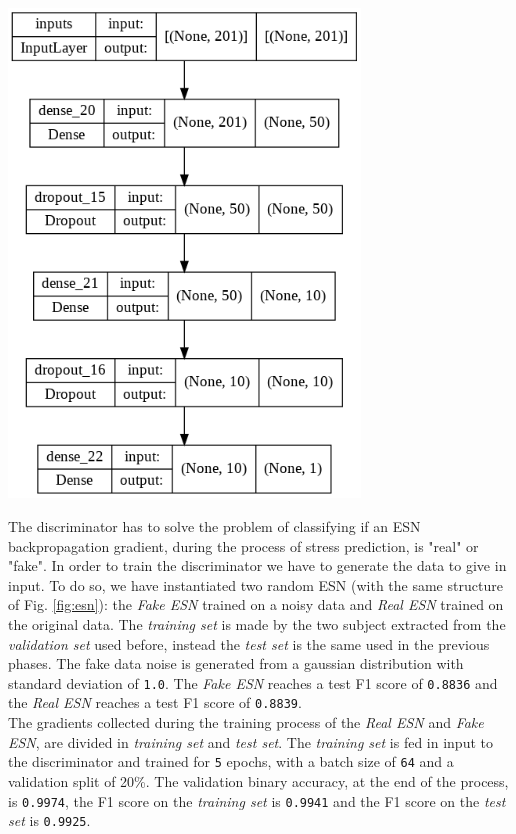 {{{\begin{center}
\begin{minipage}[c]{\textwidth}
    \centering
    \includegraphics[width=0.7\textwidth]{contents/Chapter6/disc.png}
    \label{fig:disc}
\end{minipage}
\end{center}

The discriminator has to solve the problem of classifying if an ESN backpropagation gradient, during the process of stress prediction, is "real" or "fake". In order to train the discriminator we have to generate the data to give in input. 
To do so, we have instantiated two random ESN (with the same structure of Fig. \ref{fig:esn}): the \textit{Fake ESN} trained on a noisy data and \textit{Real ESN} trained on the original data. The \textit{training set} is made by the two subject extracted from the \textit{validation set} used before, instead the \textit{test set} is the same used in the previous phases. The fake data noise is generated from a gaussian distribution with standard deviation of \texttt{1.0}. The \textit{Fake ESN} reaches a test F1 score of \texttt{0.8836} and the \textit{Real ESN} reaches a test F1 score of \texttt{0.8839}. \\

The gradients collected during the training process of the \textit{Real ESN} and \textit{Fake ESN}, are divided in \textit{training set} and \textit{test set}. The \textit{training set} is fed in input to the discriminator and trained for \texttt{5} epochs, with a batch size of \texttt{64} and a validation split of 20\%. The validation binary accuracy, at the end of the process, is \texttt{0.9974}, the F1 score on the \textit{training set} is \texttt{0.9941} and the F1 score on the \textit{test set} is \texttt{0.9925}.


}}}
